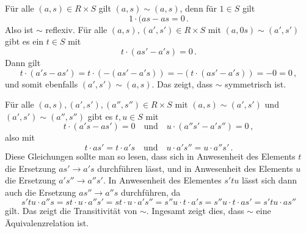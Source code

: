 \section{}





\subsection{}

Für alle $(a,s) \in R \times S$ gilt $(a,s) \sim (a,s)$, denn für $1 \in S$ gilt
\[
    1 \cdot (a s - a s
  = 0
  \,.
\]
Also ist $\sim$ reflexiv.
Für alle $(a, s), (a', s') \in R \times S$ mit $(a,0s) \sim (a', s')$ gibt es ein $t \in S$ mit
\[
    t \cdot (a s' - a' s)
  = 0
  \,.
\]
Dann gilt
\[
    t \cdot (a' s - a s')
  = t \cdot (-(a s' - a' s))
  = -(t \cdot (a s' - a' s))
  = -0
  = 0
  \,,
\]
und somit ebenfalls $(a', s') \sim (a, s)$.
Das zeigt, dass $\sim$ symmetrisch ist.

Für alle $(a, s), (a', s'), (a'', s'') \in R \times S$ mit $(a, s) \sim (a', s')$ und $(a', s') \sim (a'', s'')$ gibt es $t, u \in S$ mit
\[
    t \cdot (a' s - a s')
  = 0
  \quad\text{und}\quad
    u \cdot (a'' s' - a' s'')
  = 0
  \,,
\]
also mit
\[
    t \cdot a s'
  = t \cdot a' s
  \quad\text{und}\quad
    u \cdot a' s''
  = u \cdot a'' s'
  \,.
\]
Diese Gleichungen sollte man so lesen, dass sich in Anwesenheit des Elements $t$ die Ersetzung $a s' \to a' s$ durchführen lässt, und in Anwesenheit des Elements $u$ die Ersetzung $a' s'' \to a'' s'$.
In Anwesenheit des Elementes $s'tu$ lässt sich dann auch die Ersetzung $a s'' \to a'' s$ durchführen, da
\[
    s'tu \cdot a'' s
  = st \cdot u \cdot a'' s'
  = st \cdot u \cdot a' s''
  = s''u \cdot t \cdot a' s
  = s''u \cdot t \cdot a s'
  = s' t u \cdot a s''
\]
gilt.
Das zeigt die Transitivität von $\sim$.
Ingesamt zeigt dies, dass $\sim$ eine Äquivalenzrelation ist.




